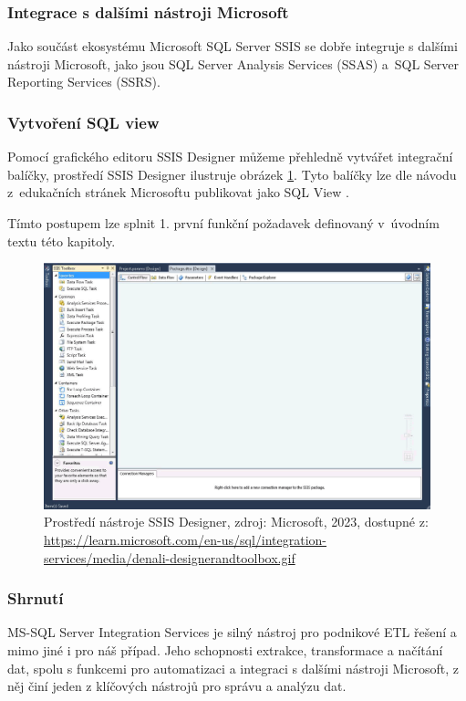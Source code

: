\subsubsection{Integrace s dalšími nástroji Microsoft} Jako součást ekosystému Microsoft SQL Server SSIS se dobře integruje s dalšími nástroji Microsoft, jako jsou SQL Server Analysis Services (SSAS) a~SQL Server Reporting Services (SSRS).

\subsubsection{Vytvoření SQL view}
Pomocí grafického editoru SSIS Designer můžeme přehledně vytvářet integrační balíčky\cite{SSISDesigner:online}, prostředí SSIS Designer ilustruje obrázek \ref{fig:SSISDesigner}.
Tyto balíčky lze dle návodu z~edukačních stránek Microsoftu publikovat jako SQL View \cite{SSISViews:online}. 

Tímto postupem lze splnit 1. první funkční požadavek definovaný v~úvodním textu této kapitoly.

\begin{figure}
    \centering
    \includegraphics[width=0.75\linewidth]{img/SSIS Designer.png}
    \caption{Prostředí nástroje SSIS Designer, zdroj: Microsoft, 2023, dostupné z: \url{https://learn.microsoft.com/en-us/sql/integration-services/media/denali-designerandtoolbox.gif}}
    \label{fig:SSISDesigner}
\end{figure}

\subsubsection{Shrnutí}
MS-SQL Server Integration Services je silný nástroj pro podnikové ETL řešení a mimo jiné i pro náš případ.
Jeho schopnosti extrakce, transformace a načítání dat, spolu s funkcemi pro automatizaci a integraci s dalšími nástroji Microsoft, z něj činí jeden z klíčových nástrojů pro správu a analýzu dat.


